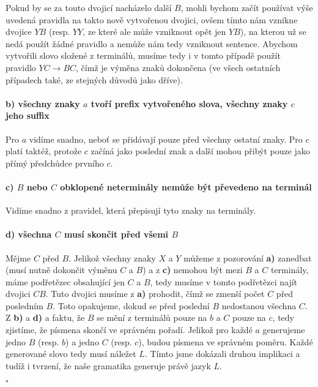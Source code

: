 \documentclass{scrartcl}
\begin{document}
    Pokud by se za touto dvojicí nacházelo další $B$, mohli bychom začít používat výše uvedená pravidla na takto nově vytvořenou dvojici, ovšem tímto nám vznikne dvojice $YB$ (resp. $YY$, ze které ale může vzniknout opět jen $YB$), na kterou už se nedá použít žádné pravidlo a nemůže nám tedy vzniknout sentence. Abychom vytvořili slovo složené z terminálů, musíme tedy i v tomto případě použít pravidlo $YC \rightarrow BC$, čímž je výměna znaků dokončena (ve všech ostatních případech také, ze stejných důvodů jako dříve).

    \paragraph{b) všechny znaky $a$ tvoří prefix vytvořeného slova, všechny znaky $c$ jeho suffix} Pro $a$ vidíme snadno, neboť se přidávají pouze před všechny ostatní znaky. Pro $c$ platí taktéž, protože $c$ začíná jako poslední znak a další mohou přibýt pouze jako přímý předchůdce prvního $c$. 

    \paragraph{c) $B$ nebo $C$ obklopené neterminály nemůže být převedeno na terminál}
    Vidíme snadno z pravidel, která přepisují tyto znaky na terminály.

    \paragraph{d) všechna $C$ musí skončit před všemi $B$}
    Mějme $C$ před $B$. Jelikož všechny znaky $X$ a $Y$ můžeme z pozorování \textbf{a)} zanedbat (musí nutně dokončit výměnu $C$ a $B$) a z \textbf{c)} nemohou být mezi $B$ a $C$ terminály, máme podřetězec obsahující jen $C$ a $B$, tedy musíme v tomto podřetězci najít dvojici $CB$. Tuto dvojici musíme z \textbf{a)} prohodit, čímž se zmenší počet $C$ před posledním $B$. Toto opakujeme, dokud se před poslední $B$ nedostanou všechna $C$.\\

    Z \textbf{b)} a \textbf{d)} a faktu, že $B$ se mění z terminálů pouze na $b$ a $C$ pouze na $c$, tedy zjistíme, že písmena skončí ve správném pořadí. Jelikož pro každé $a$ generujeme jedno $B$ (resp. $b$) a jedno $C$ (resp. $c$), budou písmena ve správném poměru. Každé generované slovo tedy musí náležet $L$. Tímto jsme dokázali druhou implikaci a tudíž i tvrzení, že naše gramatika generuje právě jazyk $L$.
    \begin{flushright}
        $\square$
    \end{flushright} 
\end{document}
